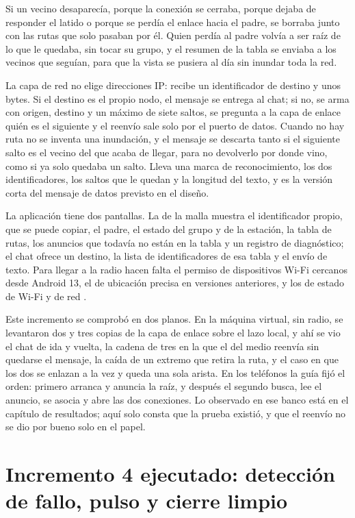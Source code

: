 \documentclass[12pt,oneside]{scrreprt}
\begin{document}
Si un vecino desaparecía, porque la conexión se cerraba, porque dejaba de responder el latido o porque se perdía el enlace hacia el padre, se borraba junto con las rutas que solo pasaban por él. Quien perdía al padre volvía a ser raíz de lo que le quedaba, sin tocar su grupo, y el resumen de la tabla se enviaba a los vecinos que seguían, para que la vista se pusiera al día sin inundar toda la red.

La capa de red no elige direcciones IP: recibe un identificador de destino y unos bytes. Si el destino es el propio nodo, el mensaje se entrega al chat; si no, se arma con origen, destino y un máximo de siete saltos, se pregunta a la capa de enlace quién es el siguiente y el reenvío sale solo por el puerto de datos. Cuando no hay ruta no se inventa una inundación, y el mensaje se descarta tanto si el siguiente salto es el vecino del que acaba de llegar, para no devolverlo por donde vino, como si ya solo quedaba un salto. Lleva una marca de reconocimiento, los dos identificadores, los saltos que le quedan y la longitud del texto, y es la versión corta del mensaje de datos previsto en el diseño.

La aplicación tiene dos pantallas. La de la malla muestra el identificador propio, que se puede copiar, el padre, el estado del grupo y de la estación, la tabla de rutas, los anuncios que todavía no están en la tabla y un registro de diagnóstico; el chat ofrece un destino, la lista de identificadores de esa tabla y el envío de texto. Para llegar a la radio hacen falta el permiso de dispositivos Wi-Fi cercanos desde Android 13, el de ubicación precisa en versiones anteriores, y los de estado de Wi-Fi y de red \parencite{Google2021}.

Este incremento se comprobó en dos planos. En la máquina virtual, sin radio, se levantaron dos y tres copias de la capa de enlace sobre el lazo local, y ahí se vio el chat de ida y vuelta, la cadena de tres en la que el del medio reenvía sin quedarse el mensaje, la caída de un extremo que retira la ruta, y el caso en que los dos se enlazan a la vez y queda una sola arista. En los teléfonos la guía fijó el orden: primero arranca y anuncia la raíz, y después el segundo busca, lee el anuncio, se asocia y abre las dos conexiones. Lo observado en ese banco está en el capítulo de resultados; aquí solo consta que la prueba existió, y que el reenvío no se dio por bueno solo en el papel.

\section{Incremento 4 ejecutado: detección de fallo, pulso y cierre limpio}
\end{document}
